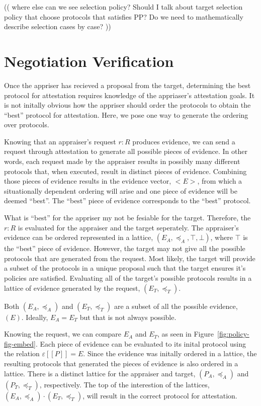 \documentclass[sigconf,authordraft]{acmart}
\begin{document}
(( where else can we see selection policy? Should I talk about target selection policy that choose protocols that satisfies PP? Do we need to mathematically describe selection cases by case?  )) 

\section{Negotiation Verification}

Once the appriser has recieved a proposal from the target, determining
the best protocol for attestation requires knowledge of the
appriaser's attestation goals. It is not initally obvious how the
appriser should order the protocols to obtain the ``best'' protocol for
attestation. Here, we pose one way to generate the ordering over
protocols.

Knowing that an appraiser's request $r:R$ produces evidence, we can
send a request through attestation to generate all possible pieces of
evidence. In other words, each request made by the appraiser
results in possibly many different protocols that, when executed,
result in distinct pieces of evidence. Combining those pieces of
evidence results in the evidence vector,  $<E>$, from which a situationally
dependent ordering will arise and one piece of evidence will be deemed
``best''. The ``best'' piece of evidence corresponds to the ``best'' protocol. 

What is ``best'' for the appriser my not be fesiable for the
target. Therefore, the $r:R$ is evaluated for the appraiser and the
target seperately. The appraiser's evidence can be ordered represented
in a lattice, $(E_A,\preceq_A, \top, \bot)$, where $\top$ is the
``best'' piece of evidence. However, the target may not give all the
possible protocols that are generated from the request. Most likely,
the target will provide a subset of the protocols in a unique proposal
such that the target ensures it's policies are satisfied. Evaluating
all of the target's possible protocols results in a lattice of
evidence generated by the request, $(E_T,\preceq_T)$.

Both $(E_A,\preceq_A)$ and $(E_T,\preceq_T)$ are a subset of all the
possible evidence, $(E)$. Ideally, $E_A = E_T$ but that is not always
possible.

Knowing the request, we can compare $E_A$ and $E_T$, as seen in
Figure~\ref{fig:policy-fig-embed}. Each piece of evidence can be
evaluated to its inital protocol using the relation
$\varepsilon [\![P]\!] = E$. Since the evidence was initally ordered
in a lattice, the resulting protocols that generated the pieces of
evidence is also ordered in a lattice. There is a distinct lattice for
the appraiser and target, $(P_A,\preceq_A)$ and
$(P_T,\preceq_T)$, respectively. The top of the interestion of the lattices,
$(E_A,\preceq_A) \cdot (E_T,\preceq_T)$, will result in the correct
protocol for attestation.
\end{document}
